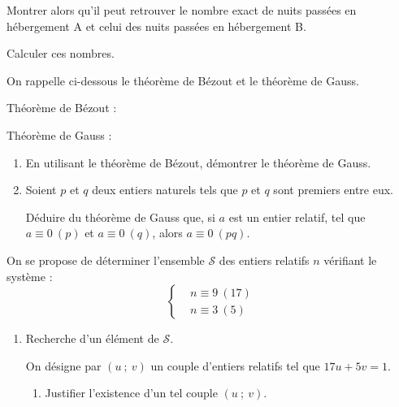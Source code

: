 \documentclass{cornouaille}
\begin{document}
\begin{exercice}
\begin{enumerate}
Montrer alors qu'il peut retrouver le nombre exact de nuits passées en hébergement A et celui des nuits passées en hébergement B.

Calculer ces nombres.
\end{enumerate}
\end{exercice}


\begin{exercice}


On rappelle ci-dessous le théorème de Bézout et le théorème de Gauss.

Théorème de Bézout :

 \fg 

Théorème de Gauss :

 \fg 

\begin{enumerate}
\item En utilisant le théorème de Bézout, démontrer le théorème de Gauss.

\item Soient $p$ et $q$ deux entiers naturels tels que $p$ et $q$ sont premiers entre eux.

Déduire du théorème de Gauss que, si $a$ est un entier relatif, tel que $a\equiv0~(p)$ et $a\equiv0~(q)$, alors $a\equiv0~(pq)$.
\end{enumerate}\medskip

\partie{}

On se propose de déterminer l'ensemble $\mathcal{S}$ des entiers relatifs $n$ vérifiant le système :
$$\left\{\begin{aligned}
				&n\equiv9~(17)\\
				&n\equiv3~(5)\end{aligned}\right.$$
\begin{enumerate}			
\item Recherche d'un élément de $\mathcal{S}$.

On désigne par $(u\ ;\ v)$ un couple d'entiers relatifs tel que $17u+5v=1$.
\begin{enumerate}
\item Justifier l'existence d'un tel couple $(u\ ;\ v)$.


\end{enumerate}
\end{enumerate}
\end{exercice}
\end{document}
